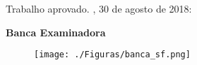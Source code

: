 
%
% 
%
\begin{folhadeaprovacao}

  \begin{center}
    {\ABNTEXchapterfont\large\imprimirautor}

    \vspace*{\fill}\vspace*{\fill}
    \begin{center}
      \ABNTEXchapterfont\bfseries\Large\imprimirtitulo
      
      \ABNTEXchapterfont\bfseries\large\imprimirsubtitulo
    \end{center}
    \vspace*{\fill}
    
    \hspace{.45\textwidth}
    \begin{minipage}{.5\textwidth}
        \imprimirpreambulo
    \end{minipage}%
    \vspace*{\fill}
   \end{center}
        
   Trabalho aprovado. \imprimirlocal, 30  de agosto de 2018:

   \center\bfseries{Banca Examinadora}
	\begin{figure}[H]
		\centering\texttt{[image: ./Figuras/banca\_sf.png]}
	\end{figure}
      
   \begin{center}
    \vspace*{0.5cm}
    {\large\imprimirlocal}
    \par
    {\large\imprimirdata}
    \vspace*{1cm}
  \end{center}
  
\end{folhadeaprovacao}
